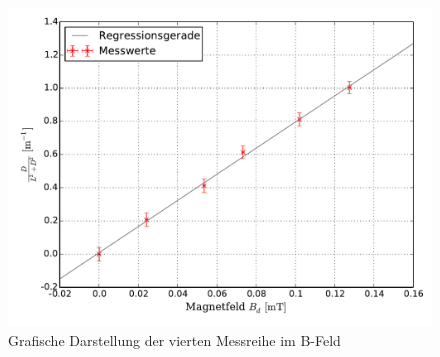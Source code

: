 		\begin{figure}[!h]
		\centering
			\includegraphics[scale=0.6]{Grafiken/BFeld_Messreihe_IV.pdf}
			\caption{Grafische Darstellung der vierten Messreihe im B-Feld}\label{fig:Auswertung_Messdaten_II_IV}
		\end{figure}
		
		
	\newpage
	\printbibliography

